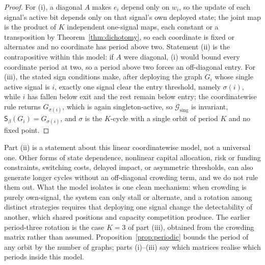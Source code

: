 \documentclass[11pt]{article}
\theoremstyle{plain}
\theoremstyle{definition}
\newcommand{\Gcal}{\mathcal{G}}
\newcommand{\Sbeta}{\mathsf{S}_\beta}
\begin{document}
\begin{proof}
For (i), a diagonal $A$ makes $e_i$ depend only on $w_i$, so the update of each signal's active bit depends only on that signal's own deployed state; the joint map is the product of $K$ independent one-signal maps, each constant or a transposition by Theorem~\ref{thm:dichotomy}, so each coordinate is fixed or alternates and no coordinate has period above two. Statement (ii) is the contrapositive within this model: if $A$ were diagonal, (i) would bound every coordinate period at two, so a period above two forces an off-diagonal entry. For (iii), the stated sign conditions make, after deploying the graph $G_i$ whose single active signal is $i$, exactly one signal clear the entry threshold, namely $\sigma(i)$, while $i$ has fallen below exit and the rest remain below entry; the coordinatewise rule returns $G_{\sigma(i)}$, which is again singleton-active, so $\Gcal_{\mathrm{sing}}$ is invariant, $\Sbeta(G_i)=G_{\sigma(i)}$, and $\sigma$ is the $K$-cycle with a single orbit of period $K$ and no fixed point.
\end{proof}

Part (ii) is a statement about this linear coordinatewise model, not a universal one. Other forms of state dependence, nonlinear capital allocation, risk or funding constraints, switching costs, delayed impact, or asymmetric thresholds, can also generate longer cycles without an off-diagonal crowding term, and we do not rule them out. What the model isolates is one clean mechanism: when crowding is purely own-signal, the system can only stall or alternate, and a rotation among distinct strategies requires that deploying one signal change the detectability of another, which shared positions and capacity competition produce. The earlier period-three rotation is the case $K=3$ of part (iii), obtained from the crowding matrix rather than assumed. Proposition~\ref{prop:periodic} bounds the period of any orbit by the number of graphs; parts (i)--(iii) say which matrices realise which periods inside this model.
\end{document}
